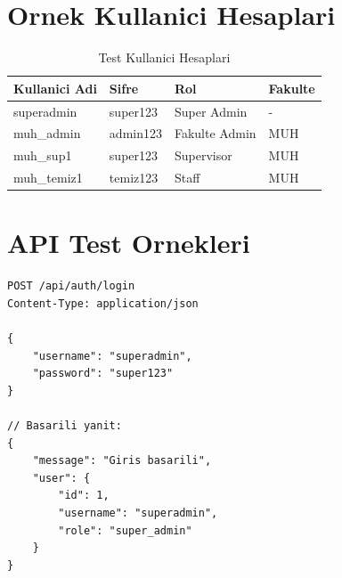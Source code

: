 \section{Ornek Kullanici Hesaplari}
\label{subsec:ornek-kullanicilar}

\begin{table}[H]
\centering
\caption{Test Kullanici Hesaplari}
\begin{tabular}{|l|l|l|l|}
\hline
\textbf{Kullanici Adi} & \textbf{Sifre} & \textbf{Rol} & \textbf{Fakulte} \\
\hline
superadmin & super123 & Super Admin & - \\
\hline
muh\_admin & admin123 & Fakulte Admin & MUH \\
\hline
muh\_sup1 & super123 & Supervisor & MUH \\
\hline
muh\_temiz1 & temiz123 & Staff & MUH \\
\hline
\end{tabular}
\end{table}

\section{API Test Ornekleri}
\label{sec:api-test}

\begin{lstlisting}[basicstyle=\ttfamily\small, frame=single, 
                   caption={Giris API Istegi}]
POST /api/auth/login
Content-Type: application/json

{
    "username": "superadmin",
    "password": "super123"
}

// Basarili yanit:
{
    "message": "Giris basarili",
    "user": {
        "id": 1,
        "username": "superadmin",
        "role": "super_admin"
    }
}
\end{lstlisting}
